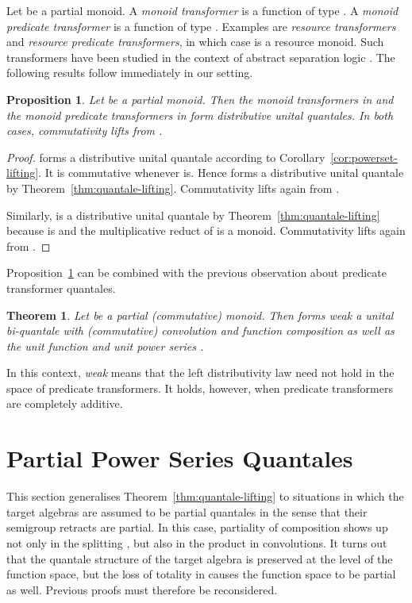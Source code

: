 \documentclass[12pt]{article}
\newtheorem{theorem}{Theorem}
\newtheorem{proposition}{Proposition}
\theoremstyle{definition}
\begin{document}
Let  be a partial monoid. A \emph{monoid transformer} is a function
of type . A \emph{monoid predicate transformer} is a
function of type . Examples are \emph{resource
  transformers} and \emph{resource predicate transformers}, in which
case  is a resource monoid. Such transformers have been studied in
the context of abstract separation logic \cite{COY07}. The following
results follow immediately in our setting.
\begin{proposition}\label{prop:ptquantale}
  Let  be a partial monoid. Then the monoid transformers in
   and the monoid predicate transformers in 
  form distributive unital quantales.  In both cases, commutativity
  lifts from .
\end{proposition}
\begin{proof}
   forms a distributive unital quantale according to
  Corollary~\ref{cor:powerset-lifting}. It is commutative whenever 
  is. Hence  forms a distributive unital quantale by
  Theorem~\ref{thm:quantale-lifting}. Commutativity lifts again from
  .

  Similarly,  is a distributive unital quantale by
  Theorem~\ref{thm:quantale-lifting} because  is and the
  multiplicative reduct of  is a monoid.  Commutativity lifts
  again from .
\end{proof}

Proposition~\ref{prop:ptquantale} can be combined with the previous
observation about predicate transformer quantales.

\begin{theorem}\label{thm:ptbiquantale}
  Let  be a partial (commutative) monoid. Then
   forms weak a
  unital bi-quantale with (commutative) convolution  and
  function composition  as well as the unit function
   and unit power series .
\end{theorem}
In this context, \emph{weak} means that the left distributivity law
 need not hold in
the space of predicate transformers. It holds, however, when predicate
transformers are completely additive.



\section{Partial Power Series Quantales} 
\label{sec:partial-formal-power}

This section generalises Theorem~\ref{thm:quantale-lifting} to
situations in which the target algebras  are assumed to be partial
quantales in the sense that their semigroup retracts are partial. In
this case, partiality of composition shows up not only in the
splitting , but also in the product  in
convolutions. It turns out that the quantale structure of the target
algebra is preserved at the level of the function space, but the loss
of totality in  causes the function space to be
partial as well. Previous proofs must therefore be reconsidered.
\end{document}
